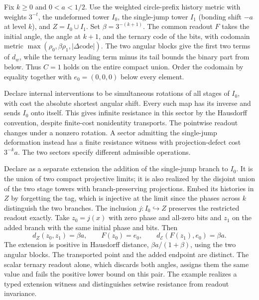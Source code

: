\begin{example}\label{ex:joint-external-null-witness}
Fix $k\geq0$ and $0<a<1/2$. Use the weighted circle-prefix history metric with weights $3^{-t}$, the undeformed tower $I_0$, the single-jump tower $I_1$ (bonding shift $-a$ at level $k$), and $Z=I_0\cup I_1$. Set $\beta=3^{-(k+1)}$. The common readout $F$ takes the initial angle, the angle at $k+1$, and the ternary code of the bits, with codomain metric $\max(\rho_0,\beta\rho_1,|\Delta\text{code}|)$. The two angular blocks give the first two terms of $d_w$, while the ternary leading term minus its tail bounds the binary part from below. Thus $C=1$ holds on the entire compact union. Order the codomain by equality together with $e_0=(0,0,0)$ below every element.

Declare internal interventions to be simultaneous rotations of all stages of $I_0$, with cost the absolute shortest angular shift. Every such map has its inverse and sends $I_0$ onto itself. This gives infinite resistance in this sector by the Hausdorff convention, despite finite-cost nonidentity transports. The pointwise readout changes under a nonzero rotation. A sector admitting the single-jump deformation instead has a finite resistance witness with projection-defect cost $3^{-k}a$. The two sectors specify different admissible operations.

Declare as a separate extension the addition of the single-jump branch to $I_0$. It is the union of two compact projective limits; it is also realized by the disjoint union of the two stage towers with branch-preserving projections. Embed its histories in $Z$ by forgetting the tag, which is injective at the limit since the phases across $k$ distinguish the two branches. The inclusion $j:I_0\hookrightarrow Z$ preserves the restricted readout exactly. Take $z_0=j(x)$ with zero phase and all-zero bits and $z_1$ on the added branch with the same initial phase and bits. Then
\[
 d_Z(z_0,z_1)=\beta a,\qquad F(z_0)=e_0,\qquad
 d_{\mathcal E}(F(z_1),e_0)=\beta a.
\]
The extension is positive in Hausdorff distance, $\beta a/(1+\beta)$, using the two angular blocks. The transported point and the added endpoint are distinct. The scalar ternary readout alone, which discards both angles, assigns them the same value and fails the positive lower bound on this pair. The example realizes a typed extension witness and distinguishes setwise resistance from readout invariance.
\end{example}


